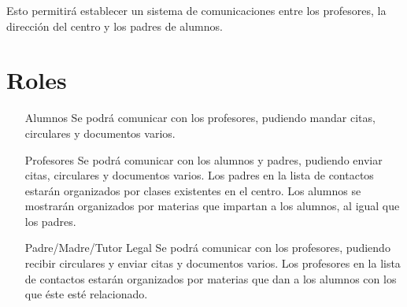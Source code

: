 Esto permitir\'a establecer un sistema de comunicaciones entre los profesores, la direcci\'on del centro y los padres de alumnos.

\section{Roles}

	\begin{itemize}
		\item[Alumnos] Se podr\'a comunicar con los profesores, pudiendo mandar citas, circulares y documentos varios.
		\item[Profesores] Se podr\'a comunicar con los alumnos y padres, pudiendo enviar citas, circulares y documentos varios. Los padres en la lista de contactos estar\'an organizados por clases existentes en el centro. Los alumnos se mostrar\'an organizados por materias que impartan a los alumnos, al igual que los padres.
		\item[Padre/Madre/Tutor Legal] Se podr\'a comunicar con los profesores, pudiendo recibir circulares y enviar citas y documentos varios. Los profesores en la lista de contactos estar\'an organizados por materias que dan a los alumnos con los que \'este est\'e relacionado.
	\end{itemize}

